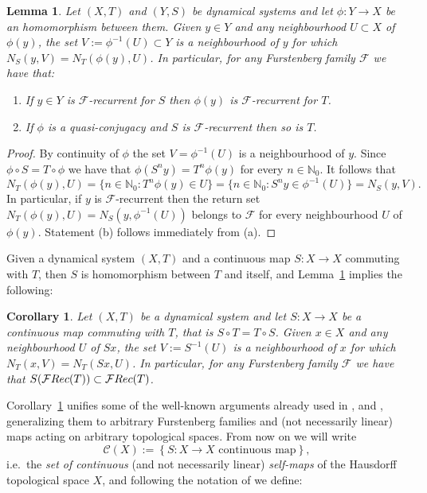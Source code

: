 \documentclass[openright,11pt]{article}
\theoremstyle{plain}
\newtheorem{lemma}[theorem]{Lemma}
\newtheorem{corollary}[theorem]{Corollary}
\theoremstyle{definition}
\newcommand{\NN}{\mathbb{N}}
\newcommand{\Ci}{\mathscr{C}}
\newcommand{\Fc}{\mathcal{F}}
\newcommand{\Rec}{\textup{Rec}}
\begin{document}
\begin{lemma}\label{Lem:homomorphism}
	Let $(X,T)$ and $(Y,S)$ be dynamical systems and let $\phi:Y\longrightarrow X$ be an homomorphism between them. Given $y\in Y$ and any neighbourhood $U \subset X$ of $\phi(y)$, the set $V:=\phi^{-1}(U) \subset Y$ is a neighbourhood of $y$ for which $N_S(y,V) = N_T(\phi(y),U)$. In particular, for any Furstenberg family $\Fc$ we have that:
	\begin{enumerate}[{\em(a)}]
		\item If $y \in Y$ is $\Fc$-recurrent for $S$ then $\phi(y)$ is $\Fc$-recurrent for $T$.
		
		\item If $\phi$ is a quasi-conjugacy and $S$ is $\Fc$-recurrent then so is $T$.
	\end{enumerate}
\end{lemma}
\begin{proof}
	By continuity of $\phi$ the set $V=\phi^{-1}(U)$ is a neighbourhood of $y$. Since $\phi\circ S = T\circ\phi$ we have that $\phi(S^ny) = T^n\phi(y)$ for every $n \in \NN_0$. It follows that
	\[
	N_T(\phi(y),U) = \{n\in\NN_0 : T^n\phi(y) \in U\} = \{n\in\NN_0 : S^ny \in \phi^{-1}(U)\} = N_S(y,V).
	\]
	In particular, if $y$ is $\Fc$-recurrent then the return set $N_T(\phi(y),U) = N_S(y,\phi^{-1}(U))$ belongs to $\Fc$ for every neighbourhood $U$ of $\phi(y)$. Statement (b) follows immediately from (a).
\end{proof}

Given a dynamical system $(X,T)$ and a continuous map $S:X\longrightarrow X$ commuting with $T$, then $S$ is homomorphism between $T$ and itself, and Lemma~\ref{Lem:homomorphism} implies the following:

\begin{corollary}\label{Cor:return-sets-commute}
	Let $(X,T)$ be a dynamical system and let $S:X\longrightarrow X$ be a continuous map commuting with $T$, that is $S \circ T = T \circ S$. Given $x \in X$ and any neighbourhood $U$ of $Sx$, the set $V:=S^{-1}(U)$ is a neighbourhood of $x$ for which $N_T(x,V) = N_T(Sx,U)$. In particular, for any Furstenberg family $\Fc$ we have that $S(\Fc\Rec(T)) \subset \Fc\Rec(T)$.
\end{corollary}

Corollary~\ref{Cor:return-sets-commute} unifies some of the well-known arguments already used in \cite[Proposition~2.5]{AmBe2019_arXiv}, \cite[Proof of Theorem 9.1]{CoMaPa2014} and \cite[Propositions 1.3 and 9.9]{Furstenberg1981_book}, generalizing them to arbitrary Furstenberg families and (not necessarily linear) maps acting on arbitrary topological spaces. From now on we will write
\[
\Ci(X) := \left\{ S:X\longrightarrow X \text{ continuous map} \right\},
\]
i.e.\ the {\em set of continuous} (and not necessarily linear) {\em self-maps} of the Hausdorff topological space $X$, and following the notation of \cite{Jungck1976} we define:
\end{document}
